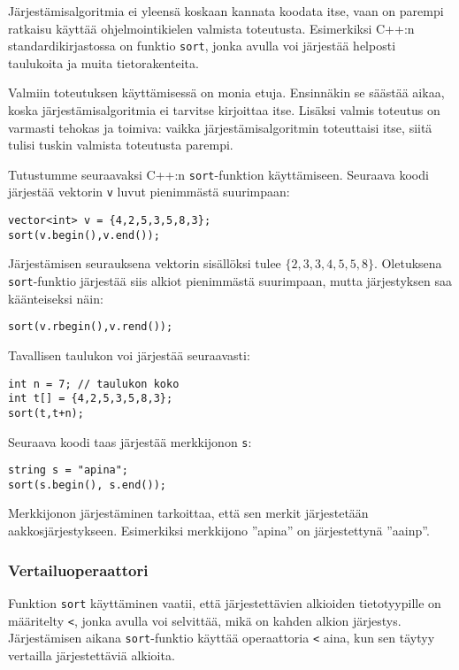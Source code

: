 Järjestämisalgoritmia
ei yleensä koskaan kannata koodata itse,
vaan on parempi ratkaisu käyttää
ohjelmointikielen valmista toteutusta.
Esimerkiksi
C++:n standardikirjastossa on funktio \texttt{sort},
jonka avulla voi järjestää helposti taulukoita
ja muita tietorakenteita.

Valmiin toteutuksen käyttämisessä on monia etuja.
Ensinnäkin se säästää aikaa, koska järjestämisalgoritmia
ei tarvitse kirjoittaa itse.
Lisäksi valmis toteutus on varmasti tehokas ja toimiva:
vaikka järjestämisalgoritmin toteuttaisi itse,
siitä tulisi tuskin valmista toteutusta parempi.

Tutustumme seuraavaksi C++:n \texttt{sort}-funktion
käyttämiseen.
Seuraava koodi järjestää vektorin \texttt{v}
luvut pienimmästä suurimpaan:
\begin{lstlisting}
vector<int> v = {4,2,5,3,5,8,3};
sort(v.begin(),v.end());
\end{lstlisting}
Järjestämisen seurauksena
vektorin sisällöksi tulee
$\{2,3,3,4,5,5,8\}$.
Oletuksena \texttt{sort}-funktio järjestää
siis alkiot pienimmästä suurimpaan,
mutta järjestyksen saa käänteiseksi näin:
\begin{lstlisting}
sort(v.rbegin(),v.rend());
\end{lstlisting}
Tavallisen taulukon voi järjestää seuraavasti:
\begin{lstlisting}
int n = 7; // taulukon koko
int t[] = {4,2,5,3,5,8,3};
sort(t,t+n);
\end{lstlisting}
Seuraava koodi taas järjestää merkkijonon \texttt{s}:
\begin{lstlisting}
string s = "apina";
sort(s.begin(), s.end());
\end{lstlisting}
Merkkijonon järjestäminen tarkoittaa,
että sen merkit järjestetään aakkosjärjestykseen.
Esimerkiksi merkkijono ''apina''
on järjestettynä ''aainp''.

\subsubsection{Vertailuoperaattori}


Funktion \texttt{sort} käyttäminen vaatii,
että järjestettävien alkioiden
tietotyypille on määritelty  \texttt{<},
jonka avulla voi selvittää, mikä on kahden alkion järjestys.
Järjestämisen aikana \texttt{sort}-funktio
käyttää operaattoria \texttt{<} aina, kun sen täytyy
vertailla järjestettäviä alkioita.

